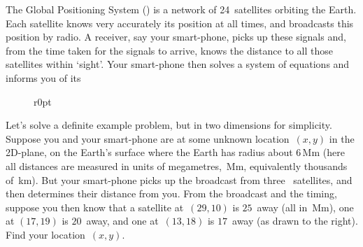 \begin{example} \label{eg:gps2}
The Global Positioning System (\gps) is a network of 24~satellites orbiting the Earth.
Each satellite knows very accurately its position at all times, and broadcasts this position by radio.
A receiver, say your smart-phone, picks up these signals and, from the time taken for the signals to arrive, knows the distance to all those satellites within `sight'.
Your smart-phone then solves a system of equations and informs you of its 

\begin{figure}r{0pt}
\end{figure}
Let's solve a definite example problem, but in two dimensions for simplicity.
Suppose you and your smart-phone are at some unknown location~\((x,y)\) in the 2D-plane, on the Earth's surface where the Earth has radius about \(6\)\,Mm (here all distances are measured in units of megametres,~Mm, equivalently thousands of~km).
But your smart-phone picks up the broadcast from three \gps\ satellites, and then determines their distance from you.
From the broadcast and the timing, suppose you then know that a satellite at~\((29,10)\) is \(25\)~away (all in~Mm), one at \((17,19)\) is \(20\)~away, and one at~\((13,18)\) is \(17\)~away (as drawn to the right).
Find your location~\((x,y)\).



\end{example}
